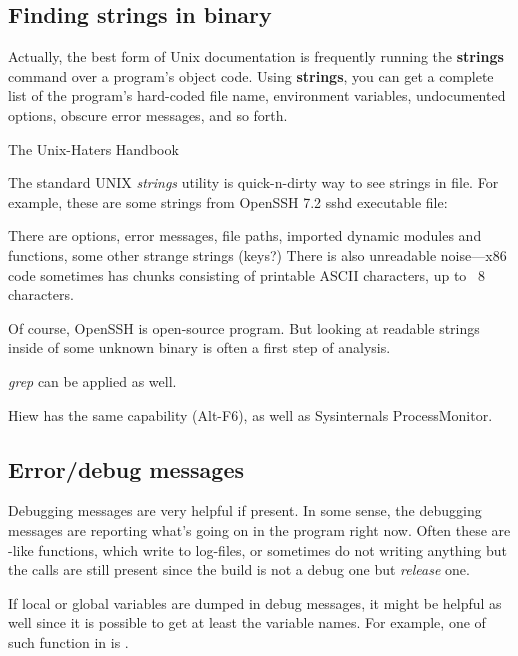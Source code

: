 \label{sec:digging_strings}



\subsection{Finding strings in binary}

\epigraph{Actually, the best form of Unix documentation is frequently running the
\textbf{strings} command over a program’s object code. Using \textbf{strings}, you can get
a complete list of the program’s hard-coded file name, environment variables,
undocumented options, obscure error messages, and so forth.}{The Unix-Haters Handbook}

The standard UNIX \emph{strings} utility is quick-n-dirty way to see strings in file.
For example, these are some strings from OpenSSH 7.2 sshd executable file:



There are options, error messages, file paths, imported dynamic modules and functions, some other strange strings (keys?)
There is also unreadable noise---x86 code sometimes has chunks consisting of printable ASCII characters, up to ~8 characters.

Of course, OpenSSH is open-source program.
But looking at readable strings inside of some unknown binary is often a first step of analysis.

\emph{grep} can be applied as well.

Hiew has the same capability (Alt-F6), as well as Sysinternals ProcessMonitor.

\subsection{Error/debug messages}

Debugging messages are very helpful if present.
In some sense, the debugging messages are reporting
what's going on in the program right now. Often these are \printf-like functions,
which write to log-files, or sometimes do not writing anything but the calls are still present 
since the build is not a debug one but \emph{release} one.
\myindex{\oracle}

If local or global variables are dumped in debug messages, it might be helpful as well 
since it is possible to get at least the variable names.
For example, one of such function in \oracle is .

